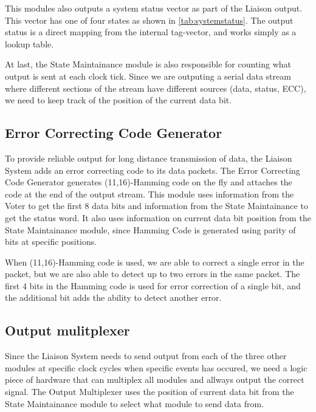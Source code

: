 This modules also outputs a system status vector as part of the Liaison output. This vector has one of four states as shown in \autoref{tab:systemstatus}.
The output status is a direct mapping from the internal tag-vector, and works simply as a lookup table.

At last, the State Maintainance module is also responsible for counting what output is sent at each clock tick. Since we are outputing a serial data stream
where different sections of the stream have different sources (data, status, ECC), we need to keep track of the position of the current data bit.

\subsection{Error Correcting Code Generator}
To provide reliable output for long distance transmission of data, the Liaison System adds an error correcting code to its data packets. The Error
Correcting Code Generator generates (11,16)-Hamming code on the fly and attaches the code at the end of the output stream. This module uses information
from the Voter to get the first 8 data bits and information from the State Maintainance to get the status word. It also uses information on current 
data bit position from the State Maintainance module, since Hamming Code is generated using parity of bits at specific positions\cite{ecc}.

When (11,16)-Hamming code is used, we are able to correct a single error in the packet, but we are also able to detect up to two errors in the same packet.
The first 4 bits in the Hamming code is used for error correction of a single bit, and the additional bit adds the ability to detect another error.

\subsection{Output mulitplexer}
Since the Liaison System needs to send output from each of the three other modules at specific clock cycles when specific events has occured, we need
a logic piece of hardware that can multiplex all modules and allways output the correct signal. The Output Multiplexer uses the position of current data bit
from the State Maintainance module to select what module to send data from.
